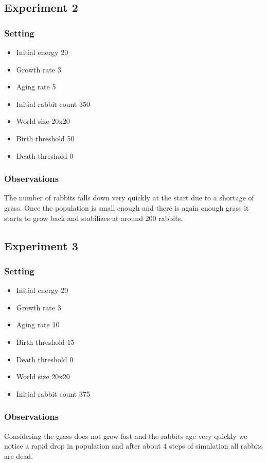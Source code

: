 \documentclass[11pt]{article}
\begin{document}
\subsection{Experiment 2}

\subsubsection{Setting}
\begin{itemize}
  \item Initial energy 20
  \item Growth rate 3
  \item Aging rate 5
  \item Initial rabbit count 350
  \item World size 20x20
  \item Birth threshold 50
  \item Death threshold 0
\end{itemize}

\subsubsection{Observations}
The number of rabbits falls down very quickly at the start due to a
shortage of grass. Once the population is small enough and there is
again enough grass it starts to grow back and stabilizes at around 200
rabbits.

\subsection{Experiment 3}

\subsubsection{Setting}
\begin{itemize}
  \item Initial energy 20
  \item Growth rate 3
  \item Aging rate 10
  \item Birth threshold 15
  \item Death threshold 0
  \item World size 20x20
  \item Initial rabbit count 375
\end{itemize}

\subsubsection{Observations}
Considering the grass does not grow fast and the rabbits age very
quickly we notice a rapid drop in population and after about 4 steps
of simulation all rabbits are dead.
\end{document}
